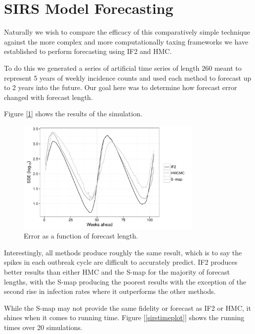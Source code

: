 \section{SIRS Model Forecasting}

	Naturally we wish to compare the efficacy of this comparatively simple technique against the more complex and more computationally taxing frameworks we have established to perform forecasting using IF2 and HMC.

	To do this we generated a series of artificial time series of length $260$ meant to represent 5 years of weekly incidence counts and used each method to forecast up to 2 years into the future. Our goal here was to determine how forecast error changed with forecast length.

	Figure [\ref{sirssseplot}] shows the results of the simulation.

	\begin{figure}
        \centering
        \captionsetup{width=.8\linewidth}
        \includegraphics[width=0.8\textwidth]{./images/sseplot.pdf}
        \caption{Error as a function of forecast length. \label{sirssseplot}}
    \end{figure}

    Interestingly, all methods produce roughly the same result, which is to say the spikes in each outbreak cycle are difficult to accurately predict. IF2 produces better results than either HMC and the S-map for the majority of forecast lengths, with the S-map producing the poorest results with the exception of the second rise in infection rates where it outperforms the other methods.

    While the S-map may not provide the same fidelity or forecast as IF2 or HMC, it shines when it comes to running time. Figure [\ref{sirstimeplot}] shows the running times over 20 simulations.

